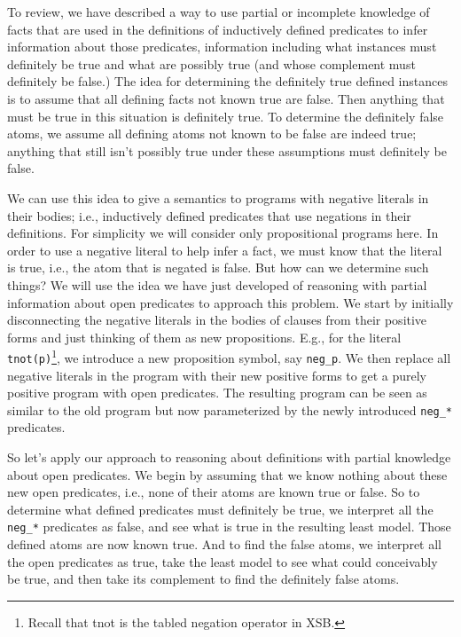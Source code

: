 To review, we have described a way to use partial or incomplete
knowledge of facts that are used in the definitions of inductively
defined predicates to infer information about those predicates,
information including what instances must definitely be true and what
are possibly true (and whose complement must definitely be false.)
The idea for determining the definitely true defined instances is to
assume that all defining facts not known true are false.  Then
anything that must be true in this situation is definitely true.  To
determine the definitely false atoms, we assume all defining atoms not
known to be false are indeed true; anything that still isn't possibly
true under these assumptions must definitely be false.

We can use this idea to give a semantics to programs with negative
literals in their bodies; i.e., inductively defined predicates that
use negations in their definitions.  For simplicity we will consider
only propositional programs here.  In order to use a negative literal
to help infer a fact, we must know that the literal is true, i.e., the
atom that is negated is false.  But how can we determine such things?
We will use the idea we have just developed of reasoning with partial
information about open predicates to approach this problem.  We start
by initially disconnecting the negative literals in the bodies of
clauses from their positive forms and just thinking of them as new
propositions.  E.g., for the literal \verb|tnot(p)|\footnote{Recall
  that tnot is the tabled negation operator in XSB.}, we introduce a
new proposition symbol, say \verb|neg_p|.  We then replace all
negative literals in the program with their new positive forms to get
a purely positive program with open predicates.  The resulting program
can be seen as similar to the old program but now parameterized by the
newly introduced \verb|neg_*| predicates.

So let's apply our approach to reasoning about definitions with
partial knowledge about open predicates.  We begin by assuming that we
know nothing about these new open predicates, i.e., none of their
atoms are known true or false.  So to determine what defined
predicates must definitely be true, we interpret all the \verb|neg_*|
predicates as false, and see what is true in the resulting least
model.  Those defined atoms are now known true.  And to find the false
atoms, we interpret all the open predicates as true, take the least
model to see what could conceivably be true, and then take its
complement to find the definitely false atoms.


